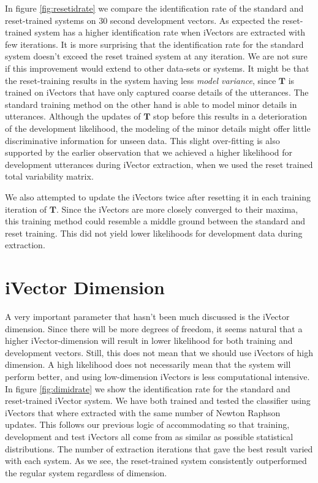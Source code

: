 In figure \ref{fig:resetidrate} we compare the identification rate of the standard and reset-trained systems on 30 second development vectors. As expected the reset-trained system has a higher identification rate when iVectors are extracted with few iterations. It is more surprising that the identification rate for the standard system doesn't exceed the reset trained system at any iteration. We are not sure if this improvement would extend to other data-sets or systems. It might be that the reset-training results in the system having less \emph{model variance}, since $\mathbf{T}$ is trained on iVectors that have only captured coarse details of the utterances. The standard training method on the other hand is able to model minor details in utterances. Although the updates of $\mathbf{T}$ stop before this results in a deterioration of the development likelihood, the modeling of the minor details might offer little discriminative information for unseen data. This slight over-fitting is also supported by the earlier observation that we achieved a higher likelihood for development utterances during iVector extraction, when we used the reset trained total variability matrix.

We also attempted to update the iVectors twice after resetting it in each training iteration of $\mathbf{T}$. Since the iVectors are more closely converged to their maxima, this training method could resemble a middle ground between the standard and reset training. This did not yield lower likelihoods for development data during extraction.

\section{iVector Dimension}
\label{sect:ivectdimtests}

A very important parameter that hasn't been much discussed is the iVector dimension. Since there will be more degrees of freedom, it seems natural that a higher iVector-dimension will result in lower likelihood for both training and development vectors. Still, this does not mean that we should use iVectors of high dimension. A high likelihood does not necessarily mean that the system will perform better, and using low-dimension iVectors is less computational intensive.  In figure \ref{fig:dimidrate} we show the identification rate for the standard and reset-trained iVector system. We have both trained and tested the classifier using iVectors that where extracted with the same number of Newton Raphson updates. This follows our previous logic of accommodating so that training, development and test iVectors all come from as similar as possible statistical distributions. The number of extraction iterations that gave the best result varied with each system. As we see, the reset-trained system consistently outperformed the regular system regardless of dimension.

